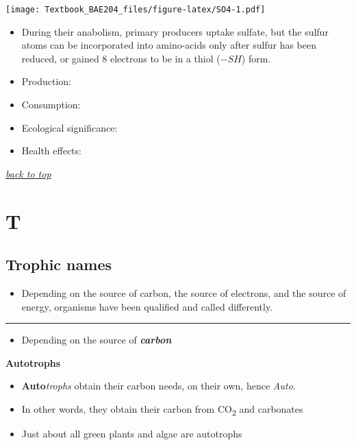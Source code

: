 \documentclass[]{book}
\providecommand{\tightlist}{%
  \setlength{\itemsep}{0pt}\setlength{\parskip}{0pt}}
\theoremstyle{definition}
\theoremstyle{definition}
\theoremstyle{definition}
\theoremstyle{remark}
\begin{document}
\texttt{[image: Textbook\_BAE204\_files/figure-latex/SO4-1.pdf]}

\begin{itemize}
\item
  During their anabolism, primary producers uptake sulfate, but the
  sulfur atoms can be incorporated into amino-acids only after sulfur
  has been reduced, or gained 8 electrons to be in a thiol (\(-SH\))
  form.
\item
  Production:
\item
  Consumption:
\item
  Ecological significance:
\item
  Health effects:
\end{itemize}

\emph{\protect\hyperlink{top}{back to top}}

\section{T}\label{t}

\hypertarget{trophic-names}{\subsection{Trophic
names}\label{trophic-names}}

\begin{itemize}
\tightlist
\item
  Depending on the source of carbon, the source of electrons, and the
  source of energy, organisms have been qualified and called
  differently.
\end{itemize}

\begin{center}\rule{0.5\linewidth}{\linethickness}\end{center}

\begin{itemize}
\tightlist
\item
  Depending on the source of \emph{\textbf{carbon}}
\end{itemize}

\textbf{Autotrophs}

\begin{itemize}
\tightlist
\item
  \textbf{Auto}\emph{trophs} obtain their carbon needs, on their own,
  hence \emph{Auto}.
\item
  In other words, they obtain their carbon from CO\textsubscript{2} and
  carbonates
\item
  Just about all green plants and algae are autotrophs
\end{itemize}
\end{document}
